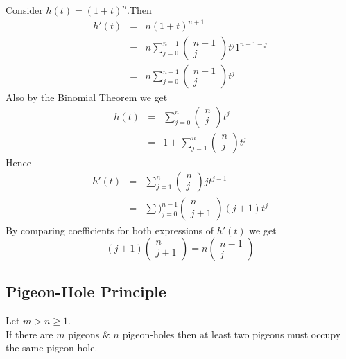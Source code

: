 \documentclass[11pt,a4paper]{article}
\begin{document}
Consider $h(t)=(1+t)^n$.Then
\[\begin{array}{rcl}
h'(t)&=&n(1+t)^{n+1}\\
&=&n\sum\limits_{j=0}^{n-1}\begin{pmatrix}n-1\\j\end{pmatrix}t^j1^{n-1-j}\\
&=&n\sum\limits_{j=0}^{n-1}\begin{pmatrix}n-1\\j\end{pmatrix}t^j
\end{array}\]
Also by the Binomial Theorem we get
\[\begin{array}{rcl}
h(t)&=&\sum\limits_{j=0}^{n}\begin{pmatrix}n\\j\end{pmatrix}t^j\\
&=&1+\sum\limits_{j=1}^{n}\begin{pmatrix}n\\j\end{pmatrix}t^j
\end{array}\]
Hence
\[\begin{array}{rcl}
h'(t)&=&\sum\limits_{j=1}^n\begin{pmatrix}n\\j\end{pmatrix}jt^{j-1}\\
&=&\sum\limits)_{j=0}^{n-1}\begin{pmatrix}n\\j+1\end{pmatrix}(j+1)t^j
\end{array}\]
By comparing coefficients for both expressions of $h'(t)$ we get
$$(j+1)\begin{pmatrix}n\\j+1\end{pmatrix}=n\begin{pmatrix}n-1\\j\end{pmatrix}$$

\subsection{Pigeon-Hole Principle}

Let $m>n\geq1$.\\
If there are $m$ pigeons \& $n$ pigeon-holes then at least two pigeons must occupy the same pigeon hole.\\
\end{document}
